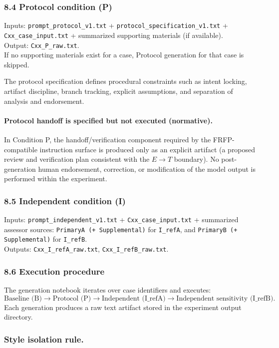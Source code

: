 {\subsubsection*{8.4 Protocol condition (P)}
Inputs: \texttt{prompt\_protocol\_v1.txt} + \texttt{protocol\_specification\_v1.txt} + \texttt{Cxx\_case\_input.txt}
+ summarized supporting materials (if available).\\
Output: \texttt{Cxx\_P\_raw.txt}.\\
If no supporting materials exist for a case, Protocol generation for that case is skipped.

The protocol specification defines procedural constraints such as intent locking, artifact discipline, branch tracking,
explicit assumptions, and separation of analysis and endorsement.

\paragraph{Protocol handoff is specified but not executed (normative).}
In Condition P, the handoff/verification component required by the FRFP-compatible
instruction surface is produced only as an explicit artifact (a proposed review and
verification plan consistent with the $E \rightarrow T$ boundary).
No post-generation human endorsement, correction, or modification of the model output
is performed within the experiment.

\subsubsection*{8.5 Independent condition (I)}
Inputs: \texttt{prompt\_independent\_v1.txt} + \texttt{Cxx\_case\_input.txt} + summarized assessor sources:
\texttt{PrimaryA (+ Supplemental)} for \texttt{I\_refA}, and \texttt{PrimaryB (+ Supplemental)} for \texttt{I\_refB}.\\
Outputs: \texttt{Cxx\_I\_refA\_raw.txt}, \texttt{Cxx\_I\_refB\_raw.txt}.

\subsubsection*{8.6 Execution procedure}
The generation notebook iterates over case identifiers and executes:
\[
\text{Baseline (B)} \rightarrow \text{Protocol (P)} \rightarrow \text{Independent (I\_refA)} \rightarrow \text{Independent sensitivity (I\_refB)}.
\]
Each generation produces a raw text artifact stored in the experiment output directory.
\subsubsection*{Style isolation rule.}

}
